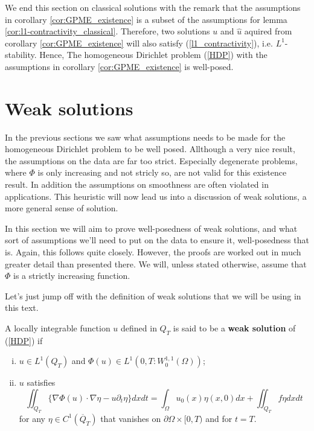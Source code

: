 \documentclass[11pt, a4paper]{article}
\begin{document}
\setcounter{rem}{0}
\begin{rem}
We end this section on classical solutions with the remark that the assumptions in corollary \ref{cor:GPME_existence} is a subset of the assumptions for lemma \ref{cor:l1-contractivity_classical}. Therefore, two solutions $u$ and $\hat{u}$ aquired from corollary \ref{cor:GPME_existence} will also satisfy (\ref{l1_contractivity}), i.e. $L^1$-stability. Hence, The homogeneous Dirichlet problem (\ref{HDP}) with the assumptions in corollary \ref{cor:GPME_existence} is well-posed.
\end{rem}


\newpage
\section{Weak solutions}
In the previous sections we saw what assumptions needs to be made for the homogeneous Dirichlet problem to be well posed. Allthough a very nice result, the assumptions on the data are far too strict. Especially degenerate problems, where $\Phi$ is only increasing and not stricly so, are not valid for this existence result. In addition the assumptions on smoothness are often violated in applications. This heuristic will now lead us into a discussion of weak solutions, a more general sense of solution. 

In this section we will aim to prove well-posedness of weak solutions, and what sort of assumptions we'll need to put on the data to ensure it, well-posedness that is. Again, this follows \citep[Ch. 5]{vazquez2007porous} quite closely. However, the proofs are worked out in much greater detail than presented there. We will, unless stated otherwise, assume that $\Phi$ is a strictly increasing function.

Let's just jump off with the definition of weak solutions that we will be using in this text.
\begin{mydef}
A locally integrable function $u$ defined in $Q_T$ is said to be a \textbf{weak solution} of (\ref{HDP}) if
\begin{enumerate}[i)]
	\item $u \in L^1(Q_T)$ and $\Phi(u) \in L^1(0,T : W_0^{1,1}(\Omega))$;
	\item $u$ satisfies
		\begin{equation}
		\label{weak}
		\iint_{Q_T} \{\nabla\Phi(u)\cdot \nabla\eta - u\partial_t \eta \}dxdt = \int_\Omega u_0(x)\eta(x,0)dx + \iint_{Q_T}f\eta dxdt
		\end{equation}
for any $\eta \in C^1(\overline{Q}_T)$ that vanishes on $\partial \Omega \times [0,T)$ and for $t=T$.
\end{enumerate}
\end{mydef}
\end{document}

